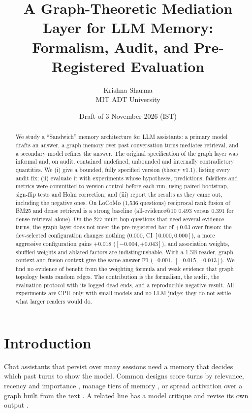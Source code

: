 \documentclass[10pt]{article}
\title{A Graph-Theoretic Mediation Layer for LLM Memory:\\Formalism, Audit, and Pre-Registered Evaluation}
\author{Krishna Sharma\\ \small MIT ADT University \todo{confirm affiliation and add contact e-mail}}
\date{Draft of 3 November 2026 (IST)}
\begin{document}
\maketitle

\begin{abstract}
We study a ``Sandwich'' memory architecture for LLM assistants: a primary model drafts an answer, a graph memory over past conversation turns mediates retrieval, and a secondary model refines the answer. The original specification of the graph layer was informal and, on audit, contained undefined, unbounded and internally contradictory quantities. We (i) give a bounded, fully specified version (theory v1.1), listing every audit fix; (ii) evaluate it with experiments whose hypotheses, predictions, falsifiers and metrics were committed to version control before each run, using paired bootstrap, sign-flip tests and Holm correction; and (iii) report the results as they came out, including the negative ones. On LoCoMo (1{,}536 questions) reciprocal rank fusion of BM25 and dense retrieval is a strong baseline (all-evidence@10 $0.493$ versus $0.391$ for dense retrieval alone). On the 277 multi-hop questions that need several evidence turns, the graph layer does not meet the pre-registered bar of $+0.03$ over fusion: the dev-selected configuration changes nothing ($0.000$, CI $[0.000,0.000]$), a more aggressive configuration gains $+0.018$ ($[-0.004,+0.043]$), and association weights, shuffled weights and ablated factors are indistinguishable. With a 1.5B reader, graph context and fusion context give the same answer F1 ($-0.001$, $[-0.015,+0.013]$). We find no evidence of benefit from the weighting formula and weak evidence that graph topology beats random edges. The contribution is the formalism, the audit, the evaluation protocol with its logged dead ends, and a reproducible negative result. All experiments are CPU-only with small models and no LLM judge; they do not settle what larger readers would do.
\end{abstract}

\section{Introduction}
Chat assistants that persist over many sessions need a memory that decides which past turns to show the model. Common designs score turns by relevance, recency and importance \cite{park2023generative}, manage tiers of memory \cite{packer2023memgpt}, or spread activation over a graph built from the text \cite{gutierrez2024hipporag}. A related line has a model critique and revise its own output \cite{madaan2023selfrefine}.
\end{document}
